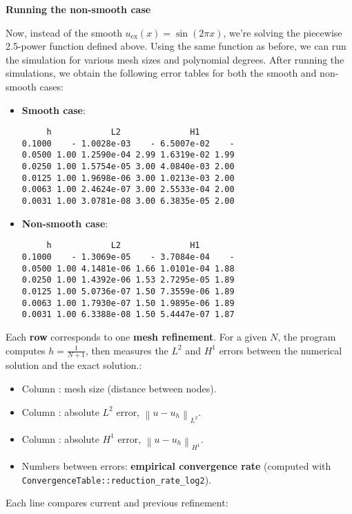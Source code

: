 \highspace
\begin{flushleft}
    \textcolor{Green3}{ \textbf{Running the non-smooth case}}
\end{flushleft}
Now, instead of the smooth $u_{\text{ex}}(x) = \sin(2\pi x)$, we're solving the piecewise 2.5-power function defined above. Using the same  function as before, we can run the simulation for various mesh sizes and polynomial degrees. After running the simulations, we obtain the following error tables for both the smooth and non-smooth cases:
\begin{itemize}
    \item \textbf{Smooth case}:
    \begin{lstlisting}
     h            L2              H1        
0.1000    - 1.0028e-03    - 6.5007e-02    - 
0.0500 1.00 1.2590e-04 2.99 1.6319e-02 1.99 
0.0250 1.00 1.5754e-05 3.00 4.0840e-03 2.00 
0.0125 1.00 1.9698e-06 3.00 1.0213e-03 2.00 
0.0063 1.00 2.4624e-07 3.00 2.5533e-04 2.00 
0.0031 1.00 3.0781e-08 3.00 6.3835e-05 2.00\end{lstlisting}

    \item \textbf{Non-smooth case}:
    \begin{lstlisting}
     h            L2              H1        
0.1000    - 1.3069e-05    - 3.7084e-04    - 
0.0500 1.00 4.1481e-06 1.66 1.0101e-04 1.88 
0.0250 1.00 1.4392e-06 1.53 2.7295e-05 1.89 
0.0125 1.00 5.0736e-07 1.50 7.3559e-06 1.89 
0.0063 1.00 1.7930e-07 1.50 1.9895e-06 1.89 
0.0031 1.00 6.3388e-08 1.50 5.4447e-07 1.87\end{lstlisting}
\end{itemize}
Each \textbf{row} corresponds to one \textbf{mesh refinement}. For a given $N$, the program computes $h = \frac{1}{N+1}$, then measures the $L^2$ and $H^1$ errors between the numerical solution and the exact solution.:
\begin{itemize}
    \item Column : mesh size (distance between nodes).
    \item Column : absolute $L^2$ error, $\left\| u - u_{h} \right\|_{L^2}$.
    \item Column : absolute $H^1$ error, $\left\| u - u_{h} \right\|_{H^1}$.
    \item Numbers between errors: \textbf{empirical convergence rate} (computed with \texttt{ConvergenceTable::reduction\_rate\_log2}).
\end{itemize}
Each line compares current and previous refinement:

